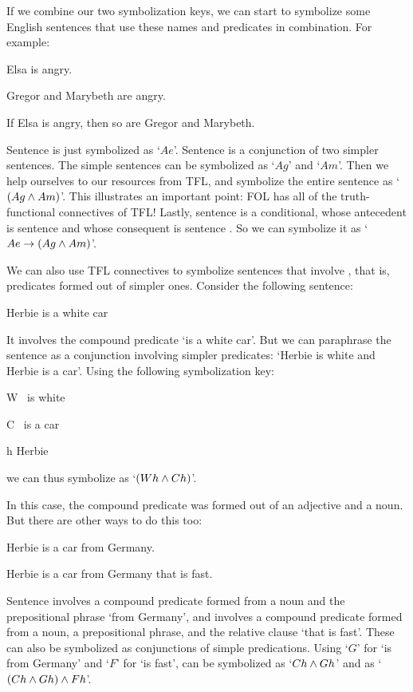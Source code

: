 If we combine our two symbolization keys, we can start to symbolize some English sentences that use these names and predicates in combination. For example:
	\begin{earg}
		\item[\ex{terms1}] Elsa is angry.
		\item[\ex{terms2a}] Gregor and Marybeth are angry.
		\item[\ex{terms2}] If Elsa is angry, then so are Gregor and Marybeth.
	\end{earg}
Sentence  is just symbolized as `$Ae$'.  Sentence  is a conjunction of two simpler sentences. The simple sentences can be symbolized as `$Ag$' and `$Am$'. Then we help ourselves to our resources from TFL, and symbolize the entire sentence as `$(Ag \wedge Am)$'. This illustrates an important point: FOL has all of the truth-functional connectives of TFL!  Lastly, sentence  is a conditional, whose antecedent is sentence  and whose consequent is sentence . So we can symbolize it as `$Ae \rightarrow (Ag \wedge Am)$'.


We can also use TFL connectives to symbolize sentences that involve , that is, predicates formed out of simpler ones.  Consider the following sentence:
	\begin{earg}
		\item[\ex{syn1}] Herbie is a white car
	\end{earg}
It involves the compound predicate `\blank is a white car'.  But we can paraphrase the sentence as a conjunction involving simpler predicates: `Herbie is white and Herbie is a car'. Using the following symbolization key:
	\begin{ekey}
		\item[W] \blank\ is white
		\item[C] \blank\ is a car
		\item[h] Herbie
	\end{ekey}
we can thus symbolize   as `$(Wh \wedge Ch)$'.

In this case, the compound predicate was formed out of an adjective and a noun.  But there are other ways to do this too:
	\begin{earg}
		\item[\ex{cp1}] Herbie is a car from Germany.
		\item[\ex{cp2}] Herbie is a car from Germany that is fast.
	\end{earg}
Sentence  involves a compound predicate formed from a noun and the prepositional phrase `from Germany', and  involves a compound predicate formed from a noun, a prepositional phrase, and the relative clause `that is fast'.  These can also be symbolized as conjunctions of simple predications.  Using `$G$' for `\blank is from Germany' and `$F$' for `\blank is fast',  can be symbolized as `$Ch \wedge Gh$' and  as `$(Ch \wedge Gh) \wedge Fh$'.


